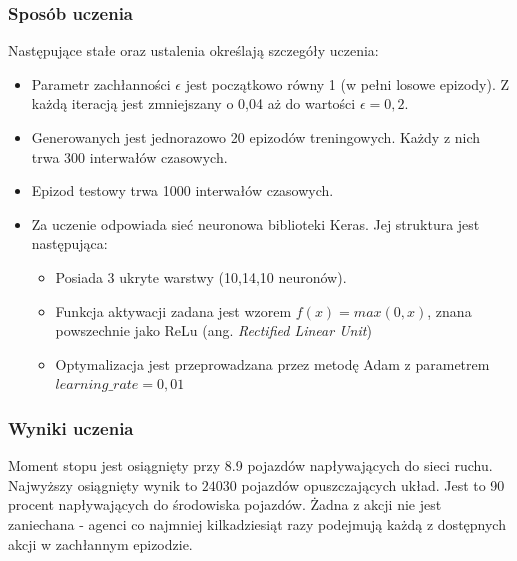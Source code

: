 \documentclass[12pt]{book}
\theoremstyle{plain}
\begin{document}
\subsubsection*{Sposób uczenia}
Następujące stałe oraz ustalenia określają szczegóły uczenia:
\begin{itemize}
	\item Parametr zachłanności $\epsilon$ jest początkowo równy 1 (w pełni losowe epizody). Z każdą iteracją jest zmniejszany o 0,04 aż do wartości $\epsilon=0,2$.
	\item Generowanych jest jednorazowo 20 epizodów treningowych. Każdy z nich trwa 300 interwałów czasowych.
	\item Epizod testowy trwa 1000 interwałów czasowych.
	\item Za uczenie odpowiada sieć neuronowa biblioteki Keras. Jej struktura jest następująca:  
	\begin{itemize}
		\item Posiada 3 ukryte warstwy (10,14,10 neuronów).
		\item Funkcja aktywacji zadana jest wzorem $f(x)=max({0,x})$, znana powszechnie jako ReLu (ang. \emph{Rectified Linear Unit})
		\item Optymalizacja jest przeprowadzana przez metodę Adam \cite{adam} z parametrem $learning\_rate = 0,01$
	\end{itemize}
\end{itemize}
\subsubsection{Wyniki uczenia}
Moment stopu jest osiągnięty przy 8.9 pojazdów napływających do sieci ruchu. Najwyższy osiągnięty wynik to $24030$ pojazdów opuszczających układ. Jest to 90 procent napływających do środowiska pojazdów. Żadna z akcji nie jest zaniechana - agenci co najmniej kilkadziesiąt razy podejmują każdą z dostępnych akcji w zachłannym epizodzie.
\end{document}
